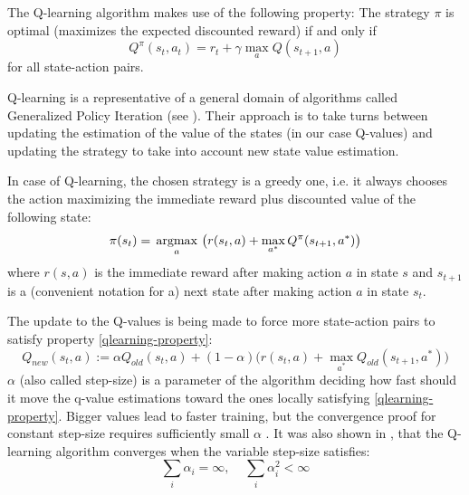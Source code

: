 The Q-learning algorithm makes use of the following property:
The strategy $\pi$ is optimal (maximizes the expected discounted reward) if and only if
\begin{equation}\label{qlearning-property}
  Q^\pi(s_t, a_t) = r_t + \gamma \max_a Q(s_{t+1}, a)
\end{equation}
for all state-action pairs.

Q-learning is a representative of a general domain of algorithms called Generalized Policy Iteration (see \cite[Chapter~4.6.]{reinforcement-book}). Their approach is to take turns between updating the estimation of the value of the states (in our case Q-values) and updating the strategy to take into account new state value estimation.
 
In case of Q-learning, the chosen strategy is a greedy one, i.e. it always chooses the action maximizing the immediate reward plus discounted value of the following state:
\begin{equation}
  \pi(s_t) = \operatorname*{\,\operatorname{argmax}\,}_a \big(r(s_t, a) + \max_{a^*} Q^\pi(s_{t+1}, a^*)\big)
\end{equation}
where $r(s, a)$ is the immediate reward after making action $a$ in state $s$ and $s_{t+1}$ is a (convenient notation for a) next state after making action $a$ in state $s_t$.

The update to the Q-values is being made to force more state-action pairs to satisfy property \eqref{qlearning-property}:
\begin{equation}
  Q_{new}(s_t, a) := \alpha Q_{old}(s_t, a) + (1 - \alpha)\big(r(s_t, a) + \max_{a^*} Q_{old}(s_{t+1}, a^*)\big)
\end{equation}
$\alpha$ (also called step-size) is a parameter of the algorithm deciding how fast should it move the q-value estimations toward the ones locally satisfying \eqref{qlearning-property}. Bigger values lead to faster training, but the convergence proof for constant step-size requires sufficiently small $\alpha$ \cite[section~3.]{qlearning-old}. It was also shown in \cite{qlearning-convergence}, that the Q-learning algorithm converges when the variable step-size satisfies:
\begin{equation}
  \sum_i \alpha_i = \infty, \;\;\;\; \sum_i \alpha_i^2 < \infty
\end{equation}

